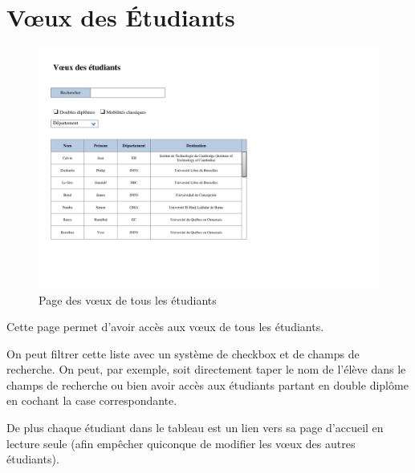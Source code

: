 \section{Vœux des Étudiants}
\label{sec::stud_wish}


\begin{figure}[H]
	\includegraphics[scale=0.8]{Etudiant/VoeuxEtudiants.pdf}
	\caption{Page des vœux de tous les étudiants}
\end{figure}


Cette page permet d'avoir accès aux vœux de tous les étudiants.

On peut filtrer cette liste avec un système de checkbox et de champs de recherche. On peut, par exemple, soit directement taper le nom de l'élève dans le champs de recherche ou bien avoir accès aux étudiants partant en double diplôme en cochant la case correspondante.

De plus chaque étudiant dans le tableau est un lien vers sa page d'accueil en lecture seule (afin empêcher quiconque de modifier les vœux des autres étudiants).

